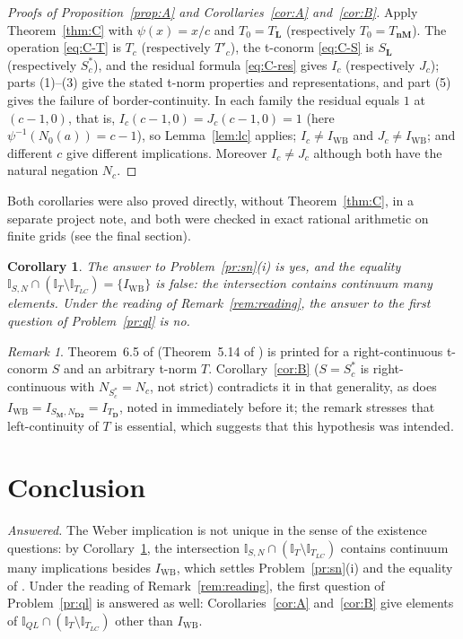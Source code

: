 \documentclass[11pt]{amsart}
\numberwithin{equation}{section}
\newtheorem{corollary}[theorem]{Corollary}
\theoremstyle{definition}
\theoremstyle{remark}
\newtheorem{remark}[theorem]{Remark}
\newcommand{\IWB}{I_{\mathrm{WB}}}
\newcommand{\cI}{\mathbb{I}}
\newcommand{\TL}{T_{\mathbf{L}}}
\newcommand{\SL}{S_{\mathbf{L}}}
\newcommand{\TnM}{T_{\mathbf{nM}}}
\newcommand{\TD}{T_{\mathbf{D}}}
\newcommand{\SM}{S_{\mathbf{M}}}
\newcommand{\ND}{N_{\mathbf{D2}}}
\begin{document}
\begin{proof}[Proofs of Proposition~\ref{prop:A} and Corollaries~\ref{cor:A}
and~\ref{cor:B}]
Apply Theorem~\ref{thm:C} with $\psi(x)=x/c$ and $T_0=\TL$ (respectively
$T_0=\TnM$). The operation \eqref{eq:C-T} is $T_c$ (respectively $T'_c$), the
t-conorm \eqref{eq:C-S} is $\SL$ (respectively $S^*_c$), and the residual
formula \eqref{eq:C-res} gives $I_c$ (respectively $J_c$); parts (1)--(3) give
the stated t-norm properties and representations, and part (5) gives the
failure of border-continuity. In each family the residual equals $1$ at $(c-1,0)$, that is,
$I_c(c-1,0)=J_c(c-1,0)=1$ (here $\psi^{-1}(N_0(a))=c-1$), so
Lemma~\ref{lem:lc} applies; $I_c\ne\IWB$ and $J_c\ne\IWB$; and different $c$
give different implications. Moreover $I_c\ne J_c$ although
both have the natural negation $N_c$.
\end{proof}

Both corollaries were also proved directly, without Theorem~\ref{thm:C}, in a
separate project note, and both were checked in exact rational arithmetic on
finite grids (see the final section).

\begin{corollary}\label{cor:answer}
The answer to Problem~\ref{pr:sn}(i) is yes, and the equality
$\cI_{S,N}\cap(\cI_T\setminus\cI_{T_{LC}})=\{\IWB\}$ is false: the
intersection contains continuum many elements. Under the reading of
Remark~\ref{rem:reading}, the answer to the first question of
Problem~\ref{pr:ql} is no.
\end{corollary}

\begin{remark}\label{rem:thm65}
Theorem~6.5 of \cite{BJ2008} (Theorem~5.14 of \cite{BJ2010}) is printed for a
right-continuous t-conorm $S$ and an arbitrary t-norm $T$.
Corollary~\ref{cor:B} ($S=S^*_c$ is right-continuous with $N_{S^*_c}=N_c$, not
strict) contradicts it in that generality, as does
$\IWB=I_{\SM,\ND}=I_{\TD}$, noted in \cite[Remark~6.4(i)]{BJ2008} immediately
before it; the remark stresses that left-continuity of $T$ is essential, which
suggests that this hypothesis was intended.
\end{remark}

\section{Conclusion}\label{sec:conclusion}

\emph{Answered.} The Weber implication is not unique in the sense of the
existence questions: by Corollary~\ref{cor:answer}, the intersection
$\cI_{S,N}\cap(\cI_T\setminus\cI_{T_{LC}})$ contains continuum many
implications besides $\IWB$, which settles Problem~\ref{pr:sn}(i) and the
equality of \cite[Problem~4.8.1]{BJ2008book}. Under the reading of
Remark~\ref{rem:reading}, the first question of Problem~\ref{pr:ql} is
answered as well: Corollaries~\ref{cor:A} and~\ref{cor:B} give elements of
$\cI_{QL}\cap(\cI_T\setminus\cI_{T_{LC}})$ other than $\IWB$.
\end{document}
